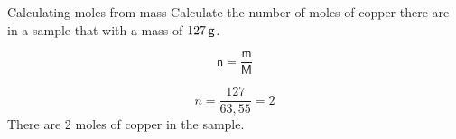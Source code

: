 \label{m38717*secfhsst!!!underscore!!!id409}\vspace{-2cm} 
      \noindent
      \begin{wex}{Calculating moles from mass }{
\label{m38717*probfhsst!!!underscore!!!id410}
      \label{m38717*id277635}Calculate the number of moles of copper there are in a sample that with a mass of $127\phantom{\rule{2pt}{0ex}}\mathsf{g}$. 
      \vspace{5pt}}
{
      \label{m38717*id277680}\nopagebreak\noindent{}
        
    \begin{equation*}
    \mathsf{n}=\frac{\mathsf{m}}{\mathsf{M}}
      \end{equation*}
      \item  
      \label{m38717*id277705}\nopagebreak\noindent{}
        
    \begin{equation*}
    n=\frac{127}{63,55}=2
      \end{equation*}
      \label{m38717*id277735}There are 2 moles of copper in the sample.
}
    \end{wex}
    
